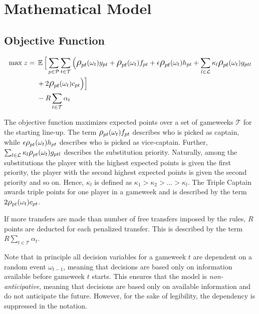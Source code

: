 \section{Mathematical Model} \label{mathematical_model}

\subsection{Objective Function}\label{sec:ob_func}

\begin{equation}
\smaller
\begin{aligned}
\text{max} \; z ={} & \EX \Big\lbrack\sum\limits_{p \in \mathcal{P}} \sum\limits_{t \in \mathcal{T}} \Big( \mathlarger{\rho}_{pt}(\omega_{t})y_{pt} + \mathlarger{\rho}_{pt}(\omega_{t})f_{pt} + \epsilon  \mathlarger{\rho}_{pt}(\omega_{t})h_{pt} + \sum_{l \in \mathcal{L}}\kappa_{l} \mathlarger{\rho}_{pt}(\omega_{t})g_{ptl}\\ 
& + 2 \mathlarger{\rho}_{pt}(\omega_{t})c_{pt} \Big)  \Big\rbrack \\ 
& - R\sum_{t \in \mathcal{T}}\alpha_{t}
\end{aligned}
\end{equation}

The objective function maximizes expected points over a set of gameweeks $\mathcal{T}$ for the starting line-up. The term $\mathlarger{\rho}_{pt}(\omega_{t})f_{pt}$ describes who is picked as captain, while $\epsilon \mathlarger{\rho}_{pt}(\omega_{t})h_{pt}$ describes who is picked as vice-captain. Further, $\sum_{l \in \mathcal{L}}\kappa_{l} \mathlarger{\rho}_{pt}(\omega_{t})g_{ptl}$ describes the substitution priority. Naturally, among the substitutions the player with the highest expected points is given the first priority, the player with the second highest expected points is given the second priority and so on. Hence, $\kappa_{l}$ is defined as $\kappa_{1} > \kappa_{2} > \ldots > \kappa_{l}$. The Triple Captain awards triple points for one player in a gameweek and is described by the term $2 \mathlarger{\rho}_{pt}(\omega_{t})c_{pt}$. 

\newpar

If more transfers are made than number of free transfers imposed by the rules, $R$ points are deducted for each penalized transfer. This is described by the term $R\sum_{t \in \mathcal{T}}\alpha_{t}$. 
 
\newpar
 
Note that in principle all decision variables for a gameweek $t$ are dependent on a random event $\omega_{t-1}$, meaning that decisions are based only on information available before gameweek $t$ starts. This ensures that the model is \textit{non-anticipative}, meaning that decisions are based only on available information and do not anticipate the future. However, for the sake of legibility, the dependency is suppressed in the notation.

